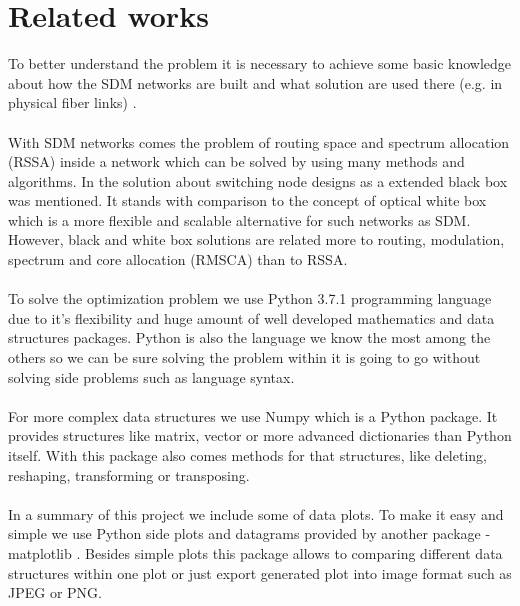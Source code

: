 \documentclass[conference]{IEEEtran}
\begin{document}
\section{Related works}
To better understand the problem it is necessary to achieve some basic knowledge about how the SDM networks are built and what solution are used there (e.g. in physical fiber links) \cite{sdm-intro}.
\\ \\
With SDM networks comes the problem of routing space and spectrum allocation (RSSA) inside a network which can be solved by using many methods and algorithms. In \cite{wb-box} the solution about  switching node designs as a extended black box was mentioned. It stands with comparison to the concept of optical white box which is a more flexible and scalable alternative for such networks as SDM. However, black and white box solutions are related more to routing, modulation, spectrum and core allocation (RMSCA) than to RSSA.
\\ \\
To solve the optimization problem we use Python 3.7.1 \cite{python} programming language due to it's flexibility and huge amount of well developed mathematics and data structures packages. Python is also the language we know the most among the others so we can be sure solving the problem within it is going to go without solving side problems such as language syntax.
\\ \\
For more complex data structures we use Numpy \cite{numpy} which is a Python package. It provides structures like matrix, vector or more advanced dictionaries than Python itself. With this package also comes methods for that structures, like deleting, reshaping, transforming or transposing.
\\ \\
In a summary of this project we include some of data plots. To make it easy and simple we use Python side plots and datagrams provided by another package - matplotlib \cite{matplotlib}. Besides simple plots this package allows to comparing different data structures within one plot or just export generated plot into image format such as JPEG or PNG.
\end{document}
